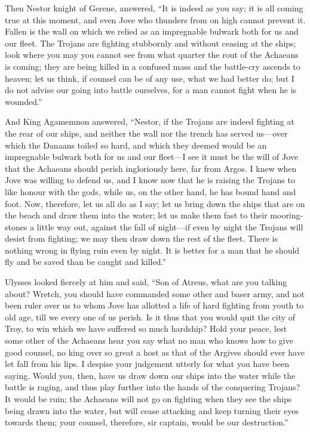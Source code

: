 Then Nestor knight of Gerene, answered, “It is indeed as you say; it is
all coming true at this moment, and even Jove who thunders from on high
cannot prevent it. Fallen is the wall on which we relied as an impregnable
bulwark both for us and our fleet. The Trojans are fighting stubbornly and
without ceasing at the ships; look where you may you cannot see from what
quarter the rout of the Achaeans is coming; they are being killed in a
confused mass and the battle-cry ascends to heaven; let us think, if
counsel can be of any use, what we had better do; but I do not advise our
going into battle ourselves, for a man cannot fight when he is wounded.”

And King Agamemnon answered, “Nestor, if the Trojans are indeed fighting
at the rear of our ships, and neither the wall nor the trench has served
us—over which the Danaans toiled so hard, and which they deemed
would be an impregnable bulwark both for us and our fleet—I see it
must be the will of Jove that the Achaeans should perish ingloriously
here, far from Argos. I knew when Jove was willing to defend us, and I
know now that he is raising the Trojans to like honour with the gods,
while us, on the other hand, he has bound hand and foot. Now, therefore,
let us all do as I say; let us bring down the ships that are on the beach
and draw them into the water; let us make them fast to their
mooring-stones a little way out, against the fall of night—if even
by night the Trojans will desist from fighting; we may then draw down the
rest of the fleet. There is nothing wrong in flying ruin even by night. It
is better for a man that he should fly and be saved than be caught and
killed.”

Ulysses looked fiercely at him and said, “Son of Atreus, what are you
talking about? Wretch, you should have commanded some other and baser
army, and not been ruler over us to whom Jove has allotted a life of hard
fighting from youth to old age, till we every one of us perish. Is it thus
that you would quit the city of Troy, to win which we have suffered so
much hardship? Hold your peace, lest some other of the Achaeans hear you
say what no man who knows how to give good counsel, no king over so great
a host as that of the Argives should ever have let fall from his lips. I
despise your judgement utterly for what you have been saying. Would you,
then, have us draw down our ships into the water while the battle is
raging, and thus play further into the hands of the conquering Trojans? It
would be ruin; the Achaeans will not go on fighting when they see the
ships being drawn into the water, but will cease attacking and keep
turning their eyes towards them; your counsel, therefore, sir captain,
would be our destruction.”


